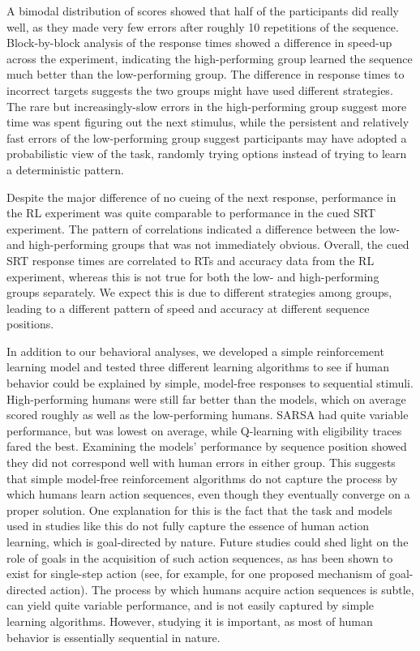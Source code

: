 \documentclass[man,floatsintext]{apa6}
\begin{document}
A bimodal distribution of scores showed that half of the participants did really well, as they made very few errors after roughly 10 repetitions of the sequence. Block-by-block analysis of the response times showed a difference in speed-up across the experiment, indicating the high-performing group learned the sequence much better than the low-performing group. The difference in response times to incorrect targets suggests the two groups might have used different strategies. The rare but increasingly-slow errors in the high-performing group suggest more time was spent figuring out the next stimulus, while the persistent and relatively fast errors of the low-performing group suggest participants may have adopted a probabilistic view of the task, randomly trying options instead of trying to learn a deterministic pattern.


Despite the major difference of no cueing of the next response, performance in the RL experiment was quite comparable to performance in the cued SRT experiment. The pattern of correlations indicated a difference between the low- and high-performing groups that was not immediately obvious. Overall, the cued SRT response times are correlated to RTs and accuracy data from the RL experiment, whereas this is not true for both the low- and high-performing groups separately. We expect this is due to different strategies among groups, leading to a different pattern of speed and accuracy at different sequence positions. 

In addition to our behavioral analyses, we developed a simple reinforcement learning model and tested three different learning algorithms to see if human behavior could be explained by simple, model-free responses to sequential stimuli. High-performing humans were still far better than the models, which on average scored roughly as well as the low-performing humans. SARSA had quite variable performance, but was lowest on average, while Q-learning with eligibility traces fared the best. Examining the models' performance by sequence position showed they did not correspond well with human errors in either group. This suggests that simple model-free reinforcement algorithms do not capture the process by which humans learn action sequences, even though they eventually converge on a proper solution. One explanation for this is the fact that the task and models used in studies like this do not fully capture the essence of human action learning, which is goal-directed by nature. Future studies could shed light on the role of goals in the acquisition of such action sequences, as has been shown to exist for single-step action (see, for example,  for one proposed mechanism of goal-directed action).  The process by which humans acquire action sequences is subtle, can yield quite variable performance, and is not easily captured by simple learning algorithms. However, studying it is important, as most of human behavior is essentially sequential in nature.





\end{document}
